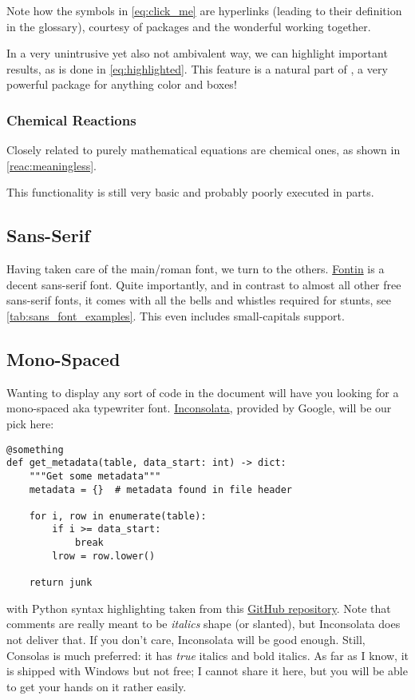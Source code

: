 Note how the symbols in \cref{eq:click_me} are hyperlinks (leading to their definition in the glossary), courtesy of packages  and the wonderful  working together.

In a very unintrusive yet also not ambivalent way, we can highlight important results, as is done in \cref{eq:highlighted}.
This feature is a natural part of , a very powerful package for anything color and boxes!

\subsubsection{Chemical Reactions}

Closely related to purely mathematical equations are chemical ones, as shown in \cref{reac:meaningless}.
\begin{chemreac}\label{reac:meaningless}
\end{chemreac}
This functionality is still very basic and probably poorly executed in parts.

\subsection{Sans-Serif}
Having taken care of the main/roman font, we turn to the others.
\href{https://www.exljbris.com/fontinsans.html}{Fontin} is a decent sans-serif font.
Quite importantly, and in contrast to almost all other free sans-serif fonts, it comes with all the bells and whistles required for stunts, see \cref{tab:sans_font_examples}.
This even includes small-capitals support.

\subsection{Mono-Spaced}\label{ch:mono-spaced}
Wanting to display any sort of code in the document will have you looking for a mono-spaced aka typewriter font.
\href{https://fonts.google.com/specimen/Inconsolata }{Inconsolata}, provided by Google, will be our pick here:
\begin{lstlisting}[style=betweenpar]
@something
def get_metadata(table, data_start: int) -> dict:
	"""Get some metadata"""
	metadata = {}  # metadata found in file header

	for i, row in enumerate(table):
		if i >= data_start:
			break
		lrow = row.lower()

	return junk
\end{lstlisting}
with Python syntax highlighting taken from this \href{https://github.com/olivierverdier/python-latex-highlighting}{GitHub repository}.
Note that comments are really meant to be \textit{italics} shape (or slanted), but Inconsolata does not deliver that.
If you don't care, Inconsolata will be good enough.
Still, Consolas is much preferred: it has \emph{true} italics and bold italics.
As far as I know, it is shipped with Windows but not free; I cannot share it here, but you will be able to get your hands on it rather easily.

